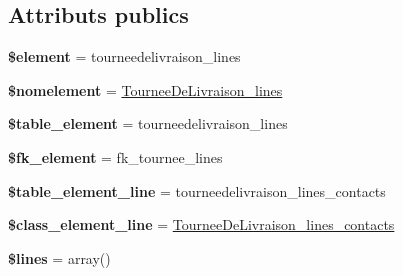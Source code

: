 \subsection*{Attributs publics}
\begin{DoxyCompactItemize}
\item 
\mbox{\label{classTourneeDeLivraison__lines_a16c7e5806cb2e0c6edbf1dd18b1fa888}} 
{\bfseries \$element} = \textquotesingle{}tourneedelivraison\+\_\+lines\textquotesingle{}
\item 
\mbox{\label{classTourneeDeLivraison__lines_a14ac96795934f3011493f64a4f2beff5}} 
{\bfseries \$nomelement} = \textquotesingle{}\hyperlink{classTourneeDeLivraison__lines}{Tournee\+De\+Livraison\+\_\+lines}\textquotesingle{}
\item 
\mbox{\label{classTourneeDeLivraison__lines_a1ceaaca10ddf3730d70c8d056f3e84bf}} 
{\bfseries \$table\+\_\+element} = \textquotesingle{}tourneedelivraison\+\_\+lines\textquotesingle{}
\item 
\mbox{\label{classTourneeDeLivraison__lines_a988bcc6ee3ad1d25983a5d6cc967df46}} 
{\bfseries \$fk\+\_\+element} = \textquotesingle{}fk\+\_\+tournee\+\_\+lines\textquotesingle{}
\item 
\mbox{\label{classTourneeDeLivraison__lines_ac2445918df8f383ec3b54417620eba14}} 
{\bfseries \$table\+\_\+element\+\_\+line} = \textquotesingle{}tourneedelivraison\+\_\+lines\+\_\+contacts\textquotesingle{}
\item 
\mbox{\label{classTourneeDeLivraison__lines_a4626e89036624c75466c815e17247bf7}} 
{\bfseries \$class\+\_\+element\+\_\+line} = \textquotesingle{}\hyperlink{classTourneeDeLivraison__lines__contacts}{Tournee\+De\+Livraison\+\_\+lines\+\_\+contacts}\textquotesingle{}
\item 
\mbox{\label{classTourneeDeLivraison__lines_a5ce9b56e16674db9eabd6e566a401dc6}} 
{\bfseries \$lines} = array()
\item 
\mbox{\label{classTourneeDeLivraison__lines_a45e96cf95ea7687664338601c4ddfbac}} 

\end{DoxyCompactItemize}
